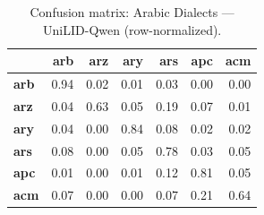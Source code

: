 \begin{table}[htbp]
\centering
\small
\begin{tabular}{lrrrrrr}
\toprule
 & \textbf{arb} & \textbf{arz} & \textbf{ary} & \textbf{ars} & \textbf{apc} & \textbf{acm} \\
\midrule
\textbf{arb} & \cellcolor{blue!93}\color{white}0.94 & \cellcolor{blue!1}0.02 & \cellcolor{blue!0}0.01 & \cellcolor{blue!2}0.03 & \cellcolor{blue!0}0.00 & \cellcolor{blue!0}0.00 \\
\textbf{arz} & \cellcolor{blue!3}0.04 & \cellcolor{blue!62}\color{white}0.63 & \cellcolor{blue!5}0.05 & \cellcolor{blue!19}0.19 & \cellcolor{blue!7}0.07 & \cellcolor{blue!1}0.01 \\
\textbf{ary} & \cellcolor{blue!3}0.04 & \cellcolor{blue!0}0.00 & \cellcolor{blue!83}\color{white}0.84 & \cellcolor{blue!8}0.08 & \cellcolor{blue!1}0.02 & \cellcolor{blue!2}0.02 \\
\textbf{ars} & \cellcolor{blue!8}0.08 & \cellcolor{blue!0}0.00 & \cellcolor{blue!5}0.05 & \cellcolor{blue!78}\color{white}0.78 & \cellcolor{blue!2}0.03 & \cellcolor{blue!5}0.05 \\
\textbf{apc} & \cellcolor{blue!1}0.01 & \cellcolor{blue!0}0.00 & \cellcolor{blue!1}0.01 & \cellcolor{blue!11}0.12 & \cellcolor{blue!80}\color{white}0.81 & \cellcolor{blue!4}0.05 \\
\textbf{acm} & \cellcolor{blue!7}0.07 & \cellcolor{blue!0}0.00 & \cellcolor{blue!0}0.00 & \cellcolor{blue!7}0.07 & \cellcolor{blue!21}0.21 & \cellcolor{blue!64}\color{white}0.64 \\
\bottomrule
\end{tabular}
\caption{Confusion matrix: Arabic Dialects — UniLID-Qwen (row-normalized).}
\label{tab:cm-arabic_dialects-unilid-qwen}
\end{table}

